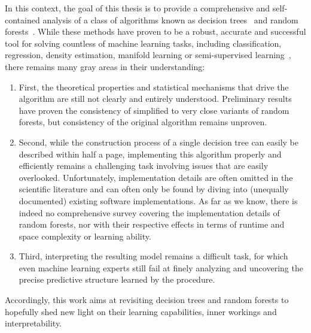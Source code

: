 In this context, the goal of this thesis is to provide a comprehensive and self-contained analysis
of a class of algorithms known as decision trees~\citep{breiman:1984} and
random forests~\citep{breiman:2001,geurts:2006}. While these
methods have proven to be a robust, accurate and successful tool for solving
countless of machine learning tasks, including classification, regression,
density estimation, manifold learning or semi-supervised
learning~\citep{criminisi:2013}, there remains many gray areas in their
understanding:
\begin{enumerate}
\item First, the theoretical properties and statistical mechanisms that drive
the algorithm are still not clearly and entirely understood. Preliminary
results have proven the consistency of simplified to very close variants of
random forests, but consistency of the original algorithm remains unproven.
\item Second, while the construction process of a single decision tree can
easily be described within half a page, implementing this algorithm properly
and efficiently remains a challenging task involving issues that are easily
overlooked. Unfortunately, implementation details are often omitted in the
scientific literature and can often only be found by diving into
(unequally documented) existing software implementations. As far as we know,
there is indeed no comprehensive survey covering the implementation details of
random forests, nor with their respective effects in terms of runtime and space
complexity or learning ability.
\item Third, interpreting the resulting model remains a difficult task,
for which even machine learning experts still fail at finely analyzing and
uncovering the precise predictive structure learned by the procedure.
\end{enumerate}
Accordingly, this work aims at revisiting decision trees and random forests to
hopefully shed new light on their learning capabilities, inner workings and
interpretability.

